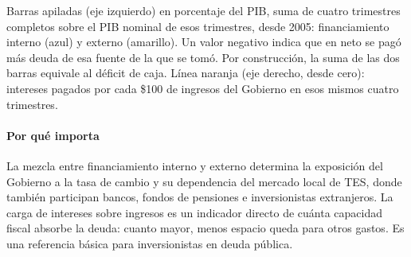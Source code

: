 \begin{leer}
Barras apiladas (eje izquierdo) en porcentaje del PIB, suma de cuatro trimestres completos sobre el PIB nominal de esos trimestres, desde 2005: financiamiento interno (azul) y externo (amarillo). Un valor negativo indica que en neto se pagó más deuda de esa fuente de la que se tomó. Por construcción, la suma de las dos barras equivale al déficit de caja. Línea naranja (eje derecho, desde cero): intereses pagados por cada \$100 de ingresos del Gobierno en esos mismos cuatro trimestres.
\end{leer}

\paragraph{Por qué importa}
La mezcla entre financiamiento interno y externo determina la exposición del Gobierno a la tasa de cambio y su dependencia del mercado local de TES, donde también participan bancos, fondos de pensiones e inversionistas extranjeros. La carga de intereses sobre ingresos es un indicador directo de cuánta capacidad fiscal absorbe la deuda: cuanto mayor, menos espacio queda para otros gastos. Es una referencia básica para inversionistas en deuda pública.

